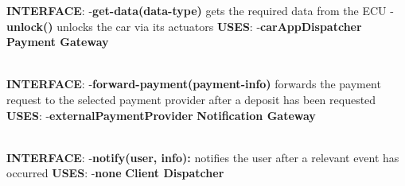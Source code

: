 \documentclass{article}
\begin{document}
\textbf{INTERFACE}: 
 \newline
-\textbf{get-data(data-type)} gets the required data from the ECU 
\newline
-\textbf{unlock()} unlocks the car via its actuators  
\newline
\textbf{USES}:   
\newline
-\textbf{carAppDispatcher}
\newpage
\textbf{Payment Gateway}\\
\begin{figure}[ht]
\end{figure}\\
\textbf{INTERFACE}: 
 \newline
-\textbf{forward-payment(payment-info)}  forwards the payment request to the selected payment provider after a deposit has been requested 
\newline
\textbf{USES}:   
\newline
-\textbf{externalPaymentProvider}
\newpage
\textbf{Notification Gateway}\\
\begin{figure}[ht]
\end{figure}\\
\textbf{INTERFACE}: 
 \newline
-\textbf{notify(user, info):} notifies the user after a relevant event has occurred  
\newline
\textbf{USES}:   
\newline
-\textbf{none}
\newpage
\textbf{Client Dispatcher}\\
\begin{figure}[ht]
\end{figure}\\
\end{document}
